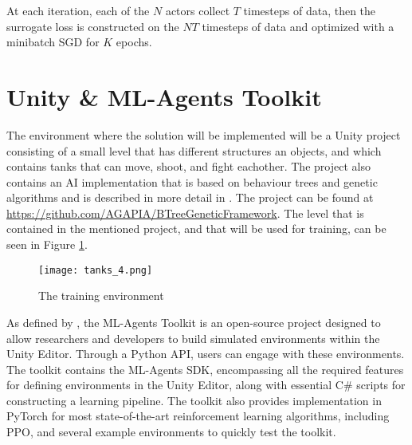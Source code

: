 At each iteration, each of the $N$ actors collect $T$ timesteps of data, then the surrogate loss is constructed on the $NT$ timesteps of data and optimized with a  minibatch SGD for $K$ epochs.


\section{Unity \& ML-Agents Toolkit}

The environment where the solution will be implemented will be a Unity project consisting of a small level that has different structures an objects, and which contains tanks that can move, shoot, and fight eachother. The project also contains an AI implementation that is based on behaviour trees and genetic algorithms and is described in more detail in \cite{paduraru2019automatic}. The project can be found at \url{https://github.com/AGAPIA/BTreeGeneticFramework}. The level that is contained in the mentioned project, and that will be used for training, can be seen in Figure \ref{photo:tank_training_env}.

\begin{figure}
    \begin{center}
        \texttt{[image: tanks\_4.png]}
        \caption{The training environment}
        \label{photo:tank_training_env}
    \end{center}
\end{figure}

As defined by \cite{juliani2020unityai}, the ML-Agents Toolkit is an open-source project designed to allow researchers and developers to build simulated environments within the Unity Editor. Through a Python API, users can engage with these environments. The toolkit contains the ML-Agents SDK, encompassing all the required features for defining environments in the Unity Editor, along with essential C\# scripts for constructing a learning pipeline. The toolkit also provides implementation in PyTorch for most state-of-the-art reinforcement learning algorithms, including PPO, and several example environments to quickly test the toolkit.

